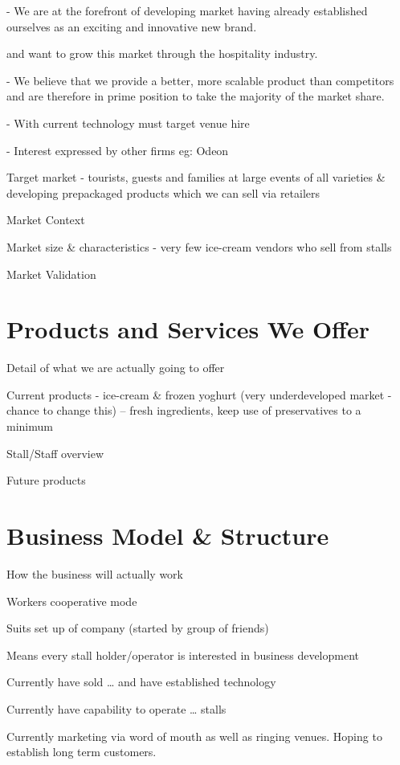 \documentclass{article}
\begin{document}
   - We are at the forefront of developing market having already established ourselves as an exciting and innovative new brand.

    and want to grow this market through the hospitality industry.

 - We believe that we provide a better, more scalable product than competitors and are therefore in prime position to take the majority of the market share.

   - With current technology must target venue hire

   - Interest expressed by other firms eg: Odeon

  Target market - tourists, guests and families at large events of all varieties & developing prepackaged products which we can sell via retailers

  Market Context

  Market size \& characteristics - very few ice-cream vendors who sell from stalls

  Market Validation


\section{Products and Services We Offer}
  Detail of what we are actually going to offer

  Current products - ice-cream & frozen yoghurt (very underdeveloped market - chance to change this)
    -- fresh ingredients, keep use of preservatives to a minimum

  Stall/Staff overview

  Future products



\section{Business Model \& Structure}
  How the business will actually work

Workers cooperative mode

Suits set up of company (started by group of friends)

Means every stall holder/operator is interested in business development

Currently have sold … and have established technology

Currently have capability to operate … stalls

Currently marketing via word of mouth as well as ringing venues.
Hoping to establish long term customers.
\end{document}
